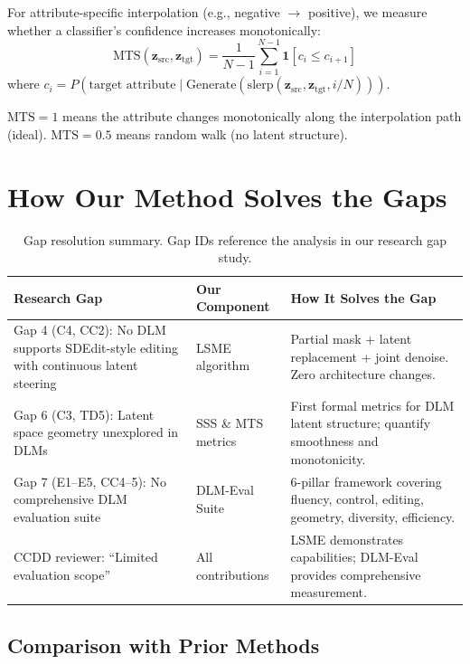 \documentclass{article}
\begin{document}
For attribute-specific interpolation (e.g., negative $\to$ positive), we measure whether a classifier's confidence increases monotonically:
\begin{equation}
    \text{MTS}(\mathbf{z}_\text{src}, \mathbf{z}_\text{tgt}) = \frac{1}{N-1} \sum_{i=1}^{N-1} \mathbf{1}\left[c_i \leq c_{i+1}\right]
\end{equation}
where $c_i = P(\text{target attribute} \mid \text{Generate}(\text{slerp}(\mathbf{z}_\text{src}, \mathbf{z}_\text{tgt}, i/N)))$.

$\text{MTS} = 1$ means the attribute changes monotonically along the interpolation path (ideal).
$\text{MTS} = 0.5$ means random walk (no latent structure).

\section{How Our Method Solves the Gaps}

\begin{table}[h]
\centering
\caption{Gap resolution summary. Gap IDs reference the analysis in our research gap study.}
\begin{tabular}{p{4.5cm}p{3cm}p{5cm}}
\toprule
\textbf{Research Gap} & \textbf{Our Component} & \textbf{How It Solves the Gap} \\
\midrule
Gap 4 (C4, CC2): No DLM supports SDEdit-style editing with continuous latent steering & LSME algorithm & Partial mask + latent replacement + joint denoise. Zero architecture changes. \\
\addlinespace
Gap 6 (C3, TD5): Latent space geometry unexplored in DLMs & SSS \& MTS metrics & First formal metrics for DLM latent structure; quantify smoothness and monotonicity. \\
\addlinespace
Gap 7 (E1--E5, CC4--5): No comprehensive DLM evaluation suite & DLM-Eval Suite & 6-pillar framework covering fluency, control, editing, geometry, diversity, efficiency. \\
\addlinespace
CCDD reviewer: ``Limited evaluation scope'' & All contributions & LSME demonstrates capabilities; DLM-Eval provides comprehensive measurement. \\
\bottomrule
\end{tabular}
\end{table}

\subsection{Comparison with Prior Methods}
\end{document}
